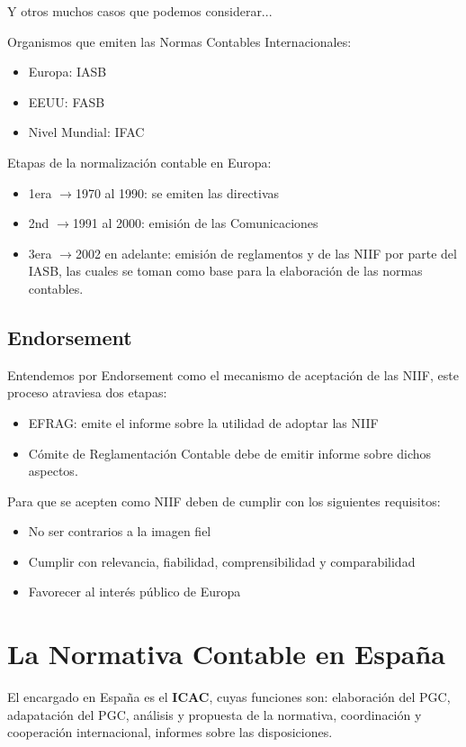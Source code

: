 \documentclass[a4paper,12pt]{article}
\newcommand{\flechita}{$\rightarrow$}
\begin{document}
Y otros muchos casos que podemos considerar...

Organismos que emiten las Normas Contables Internacionales:
\begin{itemize}
    \item Europa: IASB
    \item EEUU: FASB
    \item Nivel Mundial: IFAC
\end{itemize}

Etapas de la normalización contable en Europa:
\begin{itemize}
    \item 1era \flechita 1970 al 1990: se emiten las directivas
    \item 2nd \flechita 1991 al 2000: emisión de las Comunicaciones
    \item 3era \flechita 2002 en adelante: emisión de reglamentos y de las NIIF por parte del IASB, las cuales se toman como base para la elaboración de las normas contables.
\end{itemize}


\subsection{Endorsement}
Entendemos por Endorsement como el mecanismo de aceptación de las NIIF, este proceso atraviesa dos etapas:
\begin{itemize}
    \item EFRAG: emite el informe sobre la utilidad de adoptar las NIIF
    \item Cómite de Reglamentación Contable debe de emitir informe sobre dichos aspectos.
\end{itemize}

Para que se acepten como NIIF deben de cumplir con los siguientes requisitos:
\begin{itemize}
    \item No ser contrarios a la imagen fiel
    \item Cumplir con relevancia, fiabilidad, comprensibilidad y comparabilidad
    \item Favorecer al interés público de Europa
\end{itemize}

\section{La Normativa Contable en España}

El encargado en España es el \textbf{ICAC}, cuyas funciones son: elaboración del PGC, adapatación del PGC, análisis y propuesta de la normativa, coordinación y cooperación internacional, informes sobre las disposiciones.\\
\end{document}
